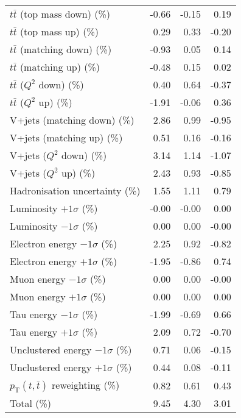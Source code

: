 \begin{table}[htbp]
{\begin{tabular}{lrrr}
$t\bar{t}$ (top mass down) (\%) & -0.66 & -0.15 & 0.19 \\ 
$t\bar{t}$ (top mass up) (\%) & 0.29 & 0.33 & -0.20 \\ 
$t\bar{t}$ (matching down) (\%) & -0.93 & 0.05 & 0.14 \\ 
$t\bar{t}$ (matching up) (\%) & -0.48 & 0.15 & 0.02 \\ 
$t\bar{t}$ ($Q^{2}$ down) (\%) & 0.40 & 0.64 & -0.37 \\ 
$t\bar{t}$ ($Q^{2}$ up) (\%) & -1.91 & -0.06 & 0.36 \\ 
V+jets (matching down) (\%) & 2.86 & 0.99 & -0.95 \\ 
V+jets (matching up) (\%) & 0.51 & 0.16 & -0.16 \\ 
V+jets ($Q^{2}$ down) (\%) & 3.14 & 1.14 & -1.07 \\ 
V+jets ($Q^{2}$ up) (\%) & 2.43 & 0.93 & -0.85 \\ 
Hadronisation uncertainty (\%) & 1.55 & 1.11 & 0.79 \\ 
Luminosity $+1\sigma$ (\%) & -0.00 & -0.00 & 0.00 \\ 
Luminosity $-1\sigma$ (\%) & 0.00 & 0.00 & -0.00 \\ 
Electron energy $-1\sigma$ (\%) & 2.25 & 0.92 & -0.82 \\ 
Electron energy $+1\sigma$ (\%) & -1.95 & -0.86 & 0.74 \\ 
Muon energy $-1\sigma$ (\%) & 0.00 & 0.00 & -0.00 \\ 
Muon energy $+1\sigma$ (\%) & 0.00 & 0.00 & 0.00 \\ 
Tau energy $-1\sigma$ (\%) & -1.99 & -0.69 & 0.66 \\ 
Tau energy $+1\sigma$ (\%) & 2.09 & 0.72 & -0.70 \\ 
Unclustered energy $-1\sigma$ (\%) & 0.71 & 0.06 & -0.15 \\ 
Unclustered energy $+1\sigma$ (\%) & 0.44 & 0.08 & -0.11 \\ 
$p_\mathrm{T}(t,\bar{t})$ reweighting (\%) & 0.82 & 0.61 & 0.43 \\ 
\hline 
Total (\%) & 9.45  & 4.30  & 3.01 \\ 
\hline 
\end{tabular}
}
\end{table}

